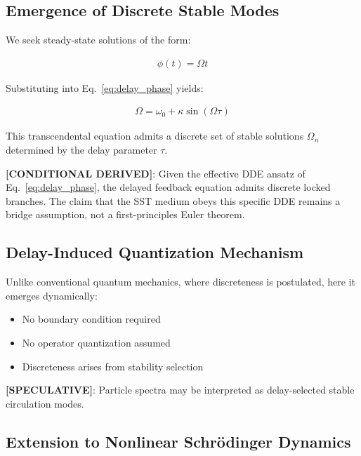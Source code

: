 \documentclass[11pt]{article}
\theoremstyle{definition}
\theoremstyle{plain}
\theoremstyle{remark}
\begin{document}
    \subsection{Emergence of Discrete Stable Modes}
        
        We seek steady-state solutions of the form:
        
        \begin{align}
            \phi(t) = \Omega t
        \end{align}
        
        Substituting into Eq.~\ref{eq:delay_phase} yields:
        
        \begin{align}
            \Omega = \omega_0 + \kappa \sin(\Omega \tau)
            \label{eq:mode_condition}
        \end{align}
        
        This transcendental equation admits a discrete set of stable solutions $\Omega_n$ determined by the delay parameter $\tau$.
        
        \textbf{[CONDITIONAL DERIVED]}: Given the effective DDE ansatz of Eq.~\eqref{eq:delay_phase}, the delayed feedback equation admits discrete locked branches. The claim that the SST medium obeys this specific DDE remains a bridge assumption, not a first-principles Euler theorem.
    
    \subsection{Delay-Induced Quantization Mechanism}
        
        Unlike conventional quantum mechanics, where discreteness is postulated, here it emerges dynamically:
        
        \begin{itemize}
            \item No boundary condition required
            \item No operator quantization assumed
            \item Discreteness arises from stability selection
        \end{itemize}
        
        \textbf{[SPECULATIVE]}: Particle spectra may be interpreted as delay-selected stable circulation modes.
    
    \subsection{Extension to Nonlinear Schrödinger Dynamics}
        
\end{document}

